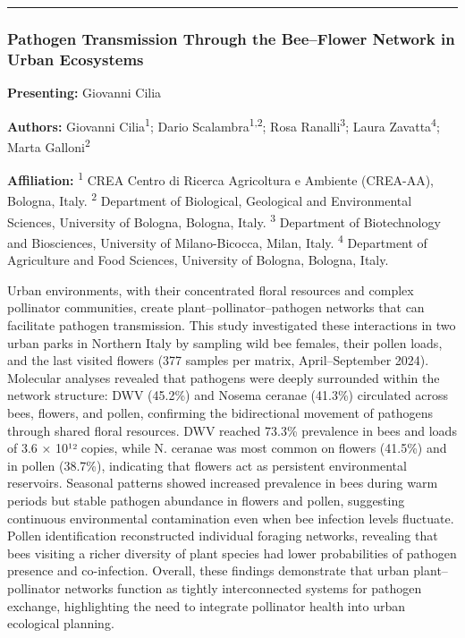 \documentclass[
  letterpaper,
  DIV=11,
  numbers=noendperiod]{scrartcl}
\begin{document}
\begin{center}\rule{0.5\linewidth}{0.5pt}\end{center}

\subsubsection{Pathogen Transmission Through the Bee--Flower Network in
Urban
Ecosystems}\label{pathogen-transmission-through-the-beeflower-network-in-urban-ecosystems}

\textbf{Presenting:} Giovanni Cilia

\textbf{Authors:} Giovanni Cilia\textsuperscript{1}; Dario
Scalambra\textsuperscript{1,2}; Rosa Ranalli\textsuperscript{3}; Laura
Zavatta\textsuperscript{4}; Marta Galloni\textsuperscript{2}

\textbf{Affiliation:} \textsuperscript{1} CREA Centro di Ricerca
Agricoltura e Ambiente (CREA-AA), Bologna, Italy. \textsuperscript{2}
Department of Biological, Geological and Environmental Sciences,
University of Bologna, Bologna, Italy. \textsuperscript{3} Department of
Biotechnology and Biosciences, University of Milano-Bicocca, Milan,
Italy. \textsuperscript{4} Department of Agriculture and Food Sciences,
University of Bologna, Bologna, Italy.

Urban environments, with their concentrated floral resources and complex
pollinator communities, create plant--pollinator--pathogen networks that
can facilitate pathogen transmission. This study investigated these
interactions in two urban parks in Northern Italy by sampling wild bee
females, their pollen loads, and the last visited flowers (377 samples
per matrix, April--September 2024). Molecular analyses revealed that
pathogens were deeply surrounded within the network structure: DWV
(45.2\%) and Nosema ceranae (41.3\%) circulated across bees, flowers,
and pollen, confirming the bidirectional movement of pathogens through
shared floral resources. DWV reached 73.3\% prevalence in bees and loads
of 3.6 × 10¹² copies, while N. ceranae was most common on flowers
(41.5\%) and in pollen (38.7\%), indicating that flowers act as
persistent environmental reservoirs. Seasonal patterns showed increased
prevalence in bees during warm periods but stable pathogen abundance in
flowers and pollen, suggesting continuous environmental contamination
even when bee infection levels fluctuate. Pollen identification
reconstructed individual foraging networks, revealing that bees visiting
a richer diversity of plant species had lower probabilities of pathogen
presence and co-infection. Overall, these findings demonstrate that
urban plant--pollinator networks function as tightly interconnected
systems for pathogen exchange, highlighting the need to integrate
pollinator health into urban ecological planning.
\end{document}
